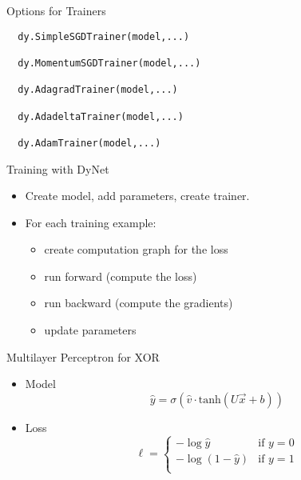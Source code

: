 \documentclass[compress]{beamer}
\begin{document}
\begin{frame}[fragile]{Options for Trainers}

\begin{verbatim}
  dy.SimpleSGDTrainer(model,...)

  dy.MomentumSGDTrainer(model,...)

  dy.AdagradTrainer(model,...)

  dy.AdadeltaTrainer(model,...)

  dy.AdamTrainer(model,...)
\end{verbatim}

\end{frame}

\begin{frame}{Training with DyNet}

\begin{itemize}
\item Create model, add parameters, create trainer.
\item For each training example:
\begin{itemize}
  \item create computation graph for the loss
  \item run forward (compute the loss)
  \item run backward (compute the gradients)
  \item update parameters
\end{itemize}
\end{itemize}

\end{frame}

\begin{frame}{Multilayer Perceptron for XOR}

\begin{itemize}
  \item Model
    \begin{equation}
      \hat y = \sigma(\hat v \cdot \mbox{tanh}(U \vec x + b))
      \end{equation}
      \item Loss
        \begin{equation}
        \ell = \begin{cases} - \log \hat y & \mbox{if }y = 0\\
          - \log (1 - \hat y) & \mbox{if }y = 1\\
          \end{cases}
          \end{equation}
\end{itemize}

\end{frame}
\end{document}
